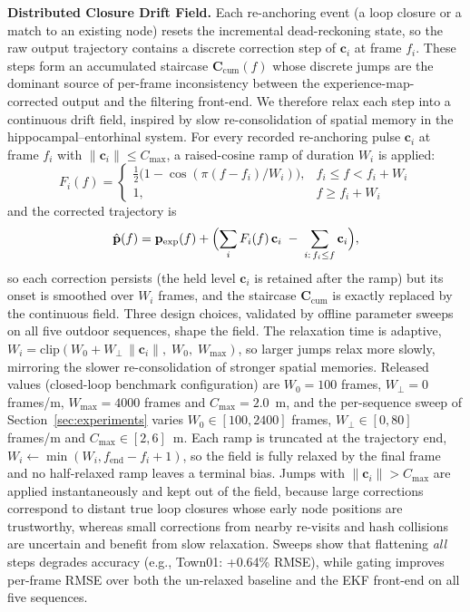 \textbf{Distributed Closure Drift Field.} Each re-anchoring event (a loop closure or a match to an existing node) resets the incremental dead-reckoning state, so the raw output trajectory contains a discrete correction step of $\mathbf{c}_i$ at frame $f_i$. These steps form an accumulated staircase $\mathbf{C}_{\mathrm{cum}}(f)$ whose discrete jumps are the dominant source of per-frame inconsistency between the experience-map-corrected output and the filtering front-end. We therefore relax each step into a continuous drift field, inspired by slow re-consolidation of spatial memory in the hippocampal--entorhinal system. For every recorded re-anchoring pulse $\mathbf{c}_i$ at frame $f_i$ with $\lVert\mathbf{c}_i\rVert \le C_{\max}$, a raised-cosine ramp of duration $W_i$ is applied:
\begin{equation}
    F_i(f) =
    \begin{cases}
        \tfrac{1}{2}\bigl(1-\cos(\pi (f-f_i)/W_i)\bigr), & f_i \le f < f_i + W_i \\
        1, & f \ge f_i + W_i
    \end{cases}
\end{equation}
and the corrected trajectory is
\begin{equation}
    \hat{\mathbf{p}}(f) = \mathbf{p}_{\mathrm{exp}}(f) + \Bigl(\sum_i F_i(f)\,\mathbf{c}_i \;-\; \sum_{i:\,f_i \le f}\mathbf{c}_i\Bigr),
\end{equation}
so each correction persists (the held level $\mathbf{c}_i$ is retained after the ramp) but its onset is smoothed over $W_i$ frames, and the staircase $\mathbf{C}_{\mathrm{cum}}$ is exactly replaced by the continuous field. Three design choices, validated by offline parameter sweeps on all five outdoor sequences, shape the field. The relaxation time is adaptive, $W_i = \mathrm{clip}(W_0 + W_{\perp}\,\lVert\mathbf{c}_i\rVert,\; W_0,\; W_{\max})$, so larger jumps relax more slowly, mirroring the slower re-consolidation of stronger spatial memories. Released values (closed-loop benchmark configuration) are $W_0 = 100$ frames, $W_{\perp} = 0$ frames/m, $W_{\max} = 4000$ frames and $C_{\max} = 2.0$~m, and the per-sequence sweep of Section~\ref{sec:experiments} varies $W_0 \in [100, 2400]$ frames, $W_{\perp} \in [0, 80]$ frames/m and $C_{\max} \in [2, 6]$~m. Each ramp is truncated at the trajectory end, $W_i \leftarrow \min(W_i, f_{\mathrm{end}}-f_i+1)$, so the field is fully relaxed by the final frame and no half-relaxed ramp leaves a terminal bias. Jumps with $\lVert\mathbf{c}_i\rVert > C_{\max}$ are applied instantaneously and kept out of the field, because large corrections correspond to distant true loop closures whose early node positions are trustworthy, whereas small corrections from nearby re-visits and hash collisions are uncertain and benefit from slow relaxation. Sweeps show that flattening \emph{all} steps degrades accuracy (e.g., Town01: +0.64\% RMSE), while gating improves per-frame RMSE over both the un-relaxed baseline and the EKF front-end on all five sequences.
